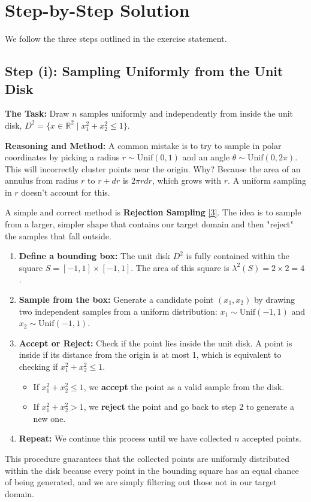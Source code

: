 \documentclass[11pt,a4paper]{article}
\newcommand{\R}{\mathbb{R}}
\begin{document}
\section{Step-by-Step Solution}
We follow the three steps outlined in the exercise statement.

\subsection{Step (i): Sampling Uniformly from the Unit Disk}
\label{sec:sampling}

\textbf{The Task:} Draw $n$ samples uniformly and independently from inside the unit disk, $D^2 = \{x \in \R^2 \mid x_1^2 + x_2^2 \le 1\}$.

\textbf{Reasoning and Method:}
A common mistake is to try to sample in polar coordinates by picking a radius $r \sim \text{Unif}(0,1)$ and an angle $\theta \sim \text{Unif}(0, 2\pi)$. This will incorrectly cluster points near the origin. Why? Because the area of an annulus from radius $r$ to $r+dr$ is $2\pi r dr$, which grows with $r$. A uniform sampling in $r$ doesn't account for this.

A simple and correct method is \textbf{Rejection Sampling} \hyperlink{note3}{[3]}. The idea is to sample from a larger, simpler shape that contains our target domain and then "reject" the samples that fall outside.

\begin{enumerate}
    \item \textbf{Define a bounding box:} The unit disk $D^2$ is fully contained within the square $S = [-1, 1] \times [-1, 1]$. The area of this square is $\lambda^2(S) = 2 \times 2 = 4$.
    \item \textbf{Sample from the box:} Generate a candidate point $(x_1, x_2)$ by drawing two independent samples from a uniform distribution: $x_1 \sim \text{Unif}(-1, 1)$ and $x_2 \sim \text{Unif}(-1, 1)$.
    \item \textbf{Accept or Reject:} Check if the point lies inside the unit disk. A point is inside if its distance from the origin is at most 1, which is equivalent to checking if $x_1^2 + x_2^2 \le 1$.
        \begin{itemize}
            \item If $x_1^2 + x_2^2 \le 1$, we \textbf{accept} the point as a valid sample from the disk.
            \item If $x_1^2 + x_2^2 > 1$, we \textbf{reject} the point and go back to step 2 to generate a new one.
        \end{itemize}
    \item \textbf{Repeat:} We continue this process until we have collected $n$ accepted points.
\end{enumerate}
This procedure guarantees that the collected points are uniformly distributed within the disk because every point in the bounding square has an equal chance of being generated, and we are simply filtering out those not in our target domain.
\end{document}
